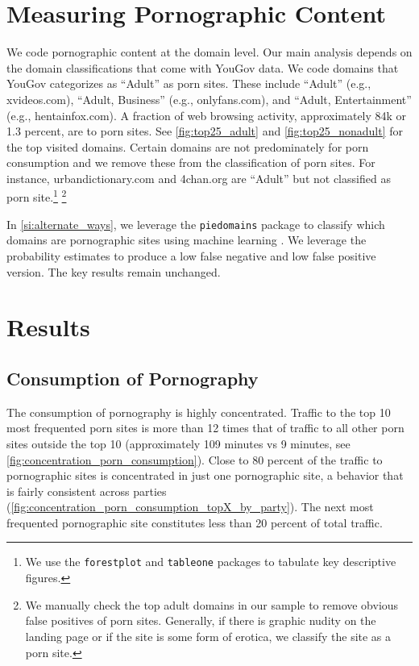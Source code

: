 \documentclass[12pt, letterpaper]{article}
\begin{document}
\section*{Measuring Pornographic Content}
We code pornographic content at the domain level. Our main analysis depends on the domain classifications that come with YouGov data. We code domains that YouGov categorizes as ``Adult'' as porn sites. These include ``Adult'' (e.g., xvideos.com), ``Adult, Business'' (e.g., onlyfans.com), and ``Adult, Entertainment'' (e.g., hentainfox.com). A fraction of web browsing activity, approximately 84k or 1.3 percent, are to porn sites. See \cref{fig:top25_adult} and \cref{fig:top25_nonadult} for the top visited domains. Certain domains are not predominately for porn consumption and we remove these from the classification of porn sites. For instance, urbandictionary.com and 4chan.org are ``Adult'' but not classified as porn site.\footnote{We use the \texttt{forestplot} \citep{forestplot} and \texttt{tableone} \citep{tableone} packages to tabulate key descriptive figures.} \footnote{We manually check the top adult domains in our sample to remove obvious false positives of porn sites. Generally, if there is graphic nudity on the landing page or if the site is some form of erotica, we classify the site as a porn site.}

In \ref{si:alternate_ways}, we leverage the \texttt{piedomains} package to classify which domains are pornographic sites using machine learning \citep{Chintalapati_piedomains_Predict_the_2022}. We leverage the probability estimates to produce a low false negative and low false positive version. The key results remain unchanged. 

\section*{Results}

\subsection*{Consumption of Pornography}
The consumption of pornography is highly concentrated. Traffic to the top 10 most frequented porn sites is more than 12 times that of traffic to all other porn sites outside the top 10 (approximately 109 minutes vs 9 minutes, see \cref{fig:concentration_porn_consumption}). Close to 80 percent of the traffic to pornographic sites is concentrated in just one pornographic site, a behavior that is fairly consistent across parties (\cref{fig:concentration_porn_consumption_topX_by_party}). The next most frequented pornographic site constitutes less than 20 percent of total traffic.
\end{document}
